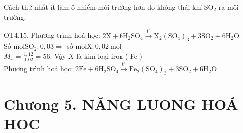 \documentclass[10pt]{article}
\begin{document}
Cách thứ nhất ít làm ô nhiểm môi trường hơn do không thải khí $\mathrm{SO}_{2}$ ra môi trường.

OT4.15. Phương trình hoá học: $2 \mathrm{X}+6 \mathrm{H}_{2} \mathrm{SO}_{4} \xrightarrow{\mathrm{t}^{\circ}} \mathrm{X}_{2}\left(\mathrm{SO}_{4}\right)_{3}+3 \mathrm{SO}_{2}+6 \mathrm{H}_{2} \mathrm{O}$\\
Số $\mathrm{mol} \mathrm{SO}_{2}: 0,03 \Rightarrow$ số $\mathrm{mol} \mathrm{X}: 0,02 \mathrm{~mol}$\\
$M_{x}=\frac{1,12}{0,02}=56$. Vậy $X$ là kim loại iron ( Fe )\\
Phương trình hoá học: $2 \mathrm{Fe}+6 \mathrm{H}_{2} \mathrm{SO}_{4} \xrightarrow{\mathrm{t}^{\circ}} \mathrm{Fe}_{2}\left(\mathrm{SO}_{4}\right)_{3}+3 \mathrm{SO}_{2}+6 \mathrm{H}_{2} \mathrm{O}$

\section*{Chưong 5. NĂNG LUONG HOÁ HOC}
\end{document}
